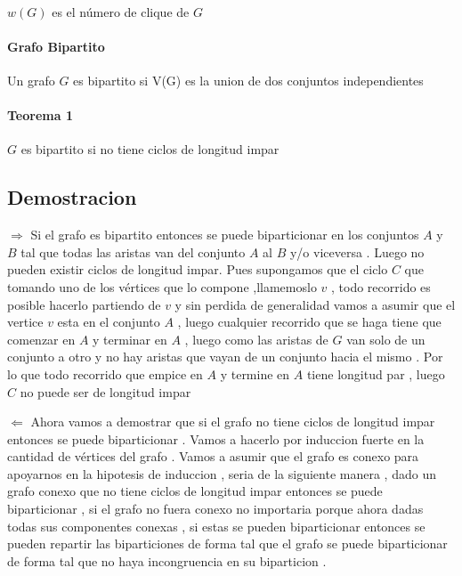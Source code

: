 \documentclass{article}
\begin{document}
	\paragraph{} $ w(G) $ es el n\'umero de clique de $G$
	
	\paragraph{Grafo Bipartito } Un grafo $G$ es bipartito si V(G) es la union de dos conjuntos independientes 
	
	\vspace*{0.5cm}
	\paragraph{Teorema 1}	
	   $G$ es bipartito si no tiene ciclos de longitud impar 
	    
	\subsection*{Demostracion} 
	 
	\hspace*{0.5cm} 
	$\Rightarrow$ Si el grafo es bipartito entonces se puede biparticionar en los conjuntos $A$ y $B$ tal que todas las aristas van del conjunto $A$ al $B$  y/o  viceversa . Luego no pueden existir ciclos de longitud impar. Pues supongamos que el ciclo $C$ que tomando uno de los v\'ertices que lo compone ,llamemoslo $v$ , todo recorrido es posible hacerlo partiendo de $v$ y sin perdida de generalidad vamos a asumir que el vertice $v$ esta en el conjunto $A$ , luego cualquier recorrido que se haga tiene que comenzar en $A$ y terminar en $A$ , luego como las aristas de $G$ van solo de un conjunto a otro y no hay aristas que vayan de un conjunto hacia el mismo . Por lo que todo recorrido que empice en $A$ y termine en $A$ tiene longitud  par , luego $C$ no puede ser de longitud impar 
	
	\vspace*{0.3cm}
	$\Leftarrow$ Ahora vamos a demostrar que si el grafo no tiene ciclos de longitud impar entonces se puede biparticionar .
	Vamos a hacerlo por induccion fuerte en la cantidad de v\'ertices del grafo . Vamos a asumir que el grafo es conexo para apoyarnos en la hipotesis de induccion , seria de la siguiente manera , dado un grafo conexo que no tiene ciclos de longitud impar entonces se puede biparticionar , si el grafo no fuera conexo no importaria porque ahora dadas todas sus componentes conexas , si estas se pueden biparticionar entonces se pueden repartir las biparticiones de forma tal que el grafo se puede biparticionar de forma tal que no haya incongruencia en su biparticion .
	
\end{document}
